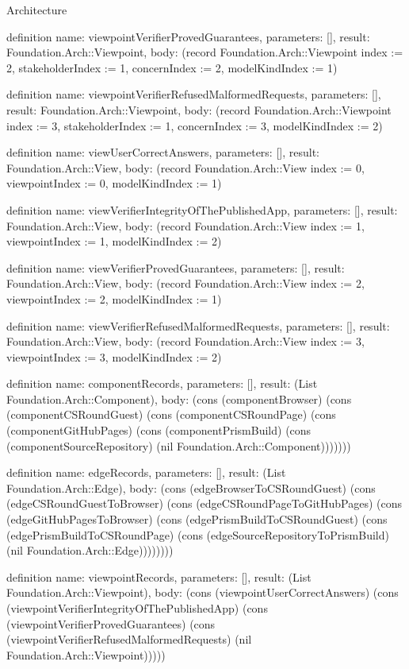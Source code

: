 \begin{lexlean}{Architecture}
\begin{semanticmodule}
definition{
  name: viewpointVerifierProvedGuarantees,
  parameters: [],
  result: Foundation.Arch::Viewpoint,
  body: (record Foundation.Arch::Viewpoint {index := 2, stakeholderIndex := 1, concernIndex := 2, modelKindIndex := 1})
}

definition{
  name: viewpointVerifierRefusedMalformedRequests,
  parameters: [],
  result: Foundation.Arch::Viewpoint,
  body: (record Foundation.Arch::Viewpoint {index := 3, stakeholderIndex := 1, concernIndex := 3, modelKindIndex := 2})
}

definition{
  name: viewUserCorrectAnswers,
  parameters: [],
  result: Foundation.Arch::View,
  body: (record Foundation.Arch::View {index := 0, viewpointIndex := 0, modelKindIndex := 1})
}

definition{
  name: viewVerifierIntegrityOfThePublishedApp,
  parameters: [],
  result: Foundation.Arch::View,
  body: (record Foundation.Arch::View {index := 1, viewpointIndex := 1, modelKindIndex := 2})
}

definition{
  name: viewVerifierProvedGuarantees,
  parameters: [],
  result: Foundation.Arch::View,
  body: (record Foundation.Arch::View {index := 2, viewpointIndex := 2, modelKindIndex := 1})
}

definition{
  name: viewVerifierRefusedMalformedRequests,
  parameters: [],
  result: Foundation.Arch::View,
  body: (record Foundation.Arch::View {index := 3, viewpointIndex := 3, modelKindIndex := 2})
}

definition{
  name: componentRecords,
  parameters: [],
  result: (List Foundation.Arch::Component),
  body: (cons (componentBrowser) (cons (componentCSRoundGuest) (cons (componentCSRoundPage) (cons (componentGitHubPages) (cons (componentPrismBuild) (cons (componentSourceRepository) (nil Foundation.Arch::Component)))))))
}

definition{
  name: edgeRecords,
  parameters: [],
  result: (List Foundation.Arch::Edge),
  body: (cons (edgeBrowserToCSRoundGuest) (cons (edgeCSRoundGuestToBrowser) (cons (edgeCSRoundPageToGitHubPages) (cons (edgeGitHubPagesToBrowser) (cons (edgePrismBuildToCSRoundGuest) (cons (edgePrismBuildToCSRoundPage) (cons (edgeSourceRepositoryToPrismBuild) (nil Foundation.Arch::Edge))))))))
}

definition{
  name: viewpointRecords,
  parameters: [],
  result: (List Foundation.Arch::Viewpoint),
  body: (cons (viewpointUserCorrectAnswers) (cons (viewpointVerifierIntegrityOfThePublishedApp) (cons (viewpointVerifierProvedGuarantees) (cons (viewpointVerifierRefusedMalformedRequests) (nil Foundation.Arch::Viewpoint)))))
}


\end{semanticmodule}
\end{lexlean}

